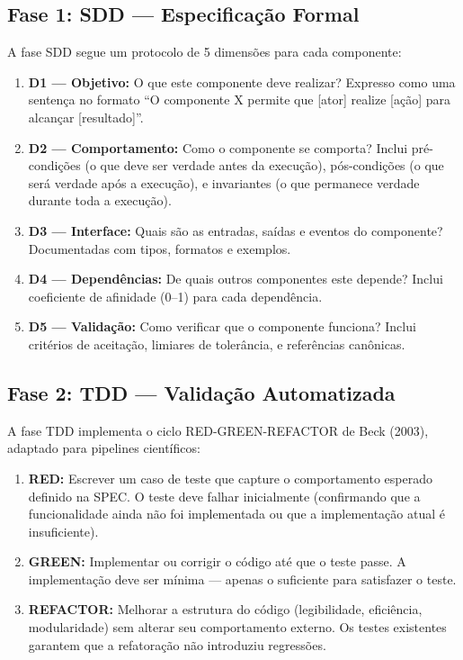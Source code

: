 \subsection{Fase 1: SDD — Especificação Formal}

A fase SDD segue um protocolo de 5 dimensões para cada componente:

\begin{enumerate}
  \item \textbf{D1 — Objetivo:} O que este componente deve realizar? Expresso como uma sentença no formato ``O componente X permite que [ator] realize [ação] para alcançar [resultado]''.
  \item \textbf{D2 — Comportamento:} Como o componente se comporta? Inclui pré-condições (o que deve ser verdade antes da execução), pós-condições (o que será verdade após a execução), e invariantes (o que permanece verdade durante toda a execução).
  \item \textbf{D3 — Interface:} Quais são as entradas, saídas e eventos do componente? Documentadas com tipos, formatos e exemplos.
  \item \textbf{D4 — Dependências:} De quais outros componentes este depende? Inclui coeficiente de afinidade (0--1) para cada dependência.
  \item \textbf{D5 — Validação:} Como verificar que o componente funciona? Inclui critérios de aceitação, limiares de tolerância, e referências canônicas.
\end{enumerate}

\subsection{Fase 2: TDD — Validação Automatizada}

A fase TDD implementa o ciclo RED-GREEN-REFACTOR de Beck (2003), adaptado para pipelines científicos:

\begin{enumerate}
  \item \textbf{RED:} Escrever um caso de teste que capture o comportamento esperado definido na SPEC. O teste deve falhar inicialmente (confirmando que a funcionalidade ainda não foi implementada ou que a implementação atual é insuficiente).
  \item \textbf{GREEN:} Implementar ou corrigir o código até que o teste passe. A implementação deve ser mínima --- apenas o suficiente para satisfazer o teste.
  \item \textbf{REFACTOR:} Melhorar a estrutura do código (legibilidade, eficiência, modularidade) sem alterar seu comportamento externo. Os testes existentes garantem que a refatoração não introduziu regressões.
\end{enumerate}

